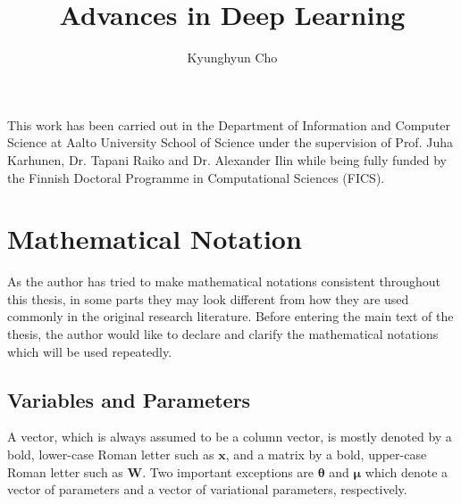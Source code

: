 \documentclass[dissertation,nocontribution,draft*]{aaltoseries}
\author{Kyunghyun Cho}
\title{Advances in Deep Learning}
\newcommand{\vect}[1]{\mathbf{#1}}
\newcommand{\vects}[1]{\boldsymbol{#1}}
\newcommand{\matr}[1]{\mathbf{#1}}
\newcommand{\vx}[0]{\vect{x}}
\newcommand{\mW}[0]{\matr{W}}
\newcommand{\vmu}[0]{\vects{\mu}}
\newcommand{\TT}[0]{{\vects{\theta}}}
\begin{document}
\draftabstract{}

\begin{preface}[Espoo]
    This work has been carried out in the Department of
    Information and Computer Science at Aalto University
    School of Science under the supervision of Prof. Juha
    Karhunen, Dr. Tapani Raiko and Dr. Alexander Ilin while
    being fully funded by the Finnish Doctoral Programme in
    Computational Sciences (FICS).
\end{preface}



\tableofcontents

\listofpublications



\renewcommand{\nomname}{List of Abbreviations}
%
\setlength{\nomitemsep}{-\parsep}
\printnomenclature[5em]


\chapter*{Mathematical Notation}
%

As the author has tried to make mathematical notations
consistent throughout this thesis, in some parts they may
look different from how they are used commonly in the
original research literature. Before entering the main text
of the thesis, the author would like to declare and clarify
the mathematical notations which will be used repeatedly.

\section*{Variables and Parameters}

A vector, which is always assumed to be a column vector, is
mostly denoted by a bold, lower-case Roman letter such as
$\vx$, and a matrix by a bold, upper-case Roman letter such
as $\mW$. Two important exceptions are $\TT$ and $\vmu$ which denote a
vector of parameters and a vector of variational parameters,
respectively.
\end{document}
